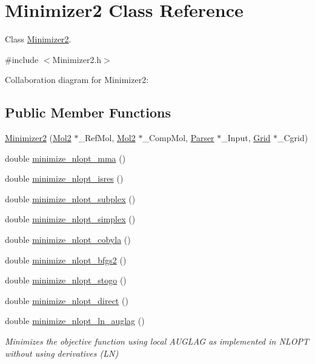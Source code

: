 \hypertarget{classMinimizer2}{
\section{Minimizer2 Class Reference}
\label{classMinimizer2}
}


Class \hyperlink{classMinimizer2}{Minimizer2}.  




{\ttfamily \#include $<$Minimizer2.h$>$}



Collaboration diagram for Minimizer2:
\subsection*{Public Member Functions}
\begin{DoxyCompactItemize}
\item 
\hyperlink{classMinimizer2_adc2a97d8a78ca35e8f9714d8033a1d82}{Minimizer2} (\hyperlink{classMol2}{Mol2} $\ast$\_\-RefMol, \hyperlink{classMol2}{Mol2} $\ast$\_\-CompMol, \hyperlink{classParser}{Parser} $\ast$\_\-Input, \hyperlink{classGrid}{Grid} $\ast$\_\-Cgrid)
\item 
double \hyperlink{classMinimizer2_a39d440b959db32c57baab3a322758821}{minimize\_\-nlopt\_\-mma} ()
\item 
double \hyperlink{classMinimizer2_aca9af00ae1cf0399a476cbb6e22e09e3}{minimize\_\-nlopt\_\-isres} ()
\item 
double \hyperlink{classMinimizer2_a781d7c1c19a0198afaa2e42bfee1651d}{minimize\_\-nlopt\_\-subplex} ()
\item 
double \hyperlink{classMinimizer2_acd7f7eb0f80c6b91268d3b81abd5bd1e}{minimize\_\-nlopt\_\-simplex} ()
\item 
double \hyperlink{classMinimizer2_a09c326d8dfd60883a7506e0ebfdf4962}{minimize\_\-nlopt\_\-cobyla} ()
\item 
double \hyperlink{classMinimizer2_a4981a5f90d855bc1d25b857881edb172}{minimize\_\-nlopt\_\-bfgs2} ()
\item 
double \hyperlink{classMinimizer2_a3c0a0abe78fc3b33e91e098d13b7f43a}{minimize\_\-nlopt\_\-stogo} ()
\item 
double \hyperlink{classMinimizer2_ac8b7b2846ad8d37e41f1b6b07045aef2}{minimize\_\-nlopt\_\-direct} ()
\item 
double \hyperlink{classMinimizer2_a9a993fd3029f2be3c6096e385e1c5ba4}{minimize\_\-nlopt\_\-ln\_\-auglag} ()
\begin{DoxyCompactList}\small\item\em Minimizes the objective function using local AUGLAG as implemented in NLOPT without using derivatives (LN) \end{DoxyCompactList}\end{DoxyCompactItemize}
